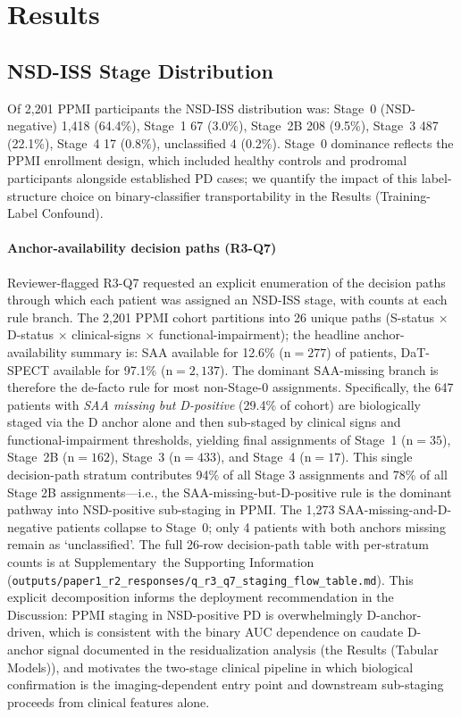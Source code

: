 \documentclass[10pt,letterpaper]{article}
\begin{document}
\section*{Results}
\label{p1:sec:results}

\subsection*{NSD-ISS Stage Distribution}
Of 2{,}201 PPMI participants the NSD-ISS distribution was: Stage~0 (NSD-negative) 1{,}418 (64.4\%), Stage~1 67 (3.0\%), Stage~2B 208 (9.5\%), Stage~3 487 (22.1\%), Stage~4 17 (0.8\%), unclassified 4 (0.2\%). Stage~0 dominance reflects the PPMI enrollment design, which included healthy controls and prodromal participants alongside established PD cases; we quantify the impact of this label-structure choice on binary-classifier transportability in the Results (Training-Label Confound).

\paragraph*{Anchor-availability decision paths (R3-Q7)} Reviewer-flagged R3-Q7 requested an explicit enumeration of the decision paths through which each patient was assigned an NSD-ISS stage, with counts at each rule branch. The 2{,}201 PPMI cohort partitions into 26 unique paths (S-status $\times$ D-status $\times$ clinical-signs $\times$ functional-impairment); the headline anchor-availability summary is: SAA available for 12.6\% (n${=}277$) of patients, DaT-SPECT available for 97.1\% (n${=}2{,}137$). The dominant SAA-missing branch is therefore the de-facto rule for most non-Stage-0 assignments. Specifically, the 647 patients with \emph{SAA missing but D-positive} (29.4\% of cohort) are biologically staged via the D anchor alone and then sub-staged by clinical signs and functional-impairment thresholds, yielding final assignments of Stage~1 (n${=}35$), Stage~2B (n${=}162$), Stage~3 (n${=}433$), and Stage~4 (n${=}17$). This single decision-path stratum contributes 94\% of all Stage 3 assignments and 78\% of all Stage 2B assignments---i.e., the SAA-missing-but-D-positive rule is the dominant pathway into NSD-positive sub-staging in PPMI. The 1{,}273 SAA-missing-and-D-negative patients collapse to Stage~0; only 4 patients with both anchors missing remain as `unclassified'. The full 26-row decision-path table with per-stratum counts is at Supplementary~the Supporting Information (\texttt{outputs/paper1\_r2\_responses/q\_r3\_q7\_staging\_flow\_table.md}). This explicit decomposition informs the deployment recommendation in the Discussion: PPMI staging in NSD-positive PD is overwhelmingly D-anchor-driven, which is consistent with the binary AUC dependence on caudate D-anchor signal documented in the residualization analysis (the Results (Tabular Models)), and motivates the two-stage clinical pipeline in which biological confirmation is the imaging-dependent entry point and downstream sub-staging proceeds from clinical features alone.
\end{document}
